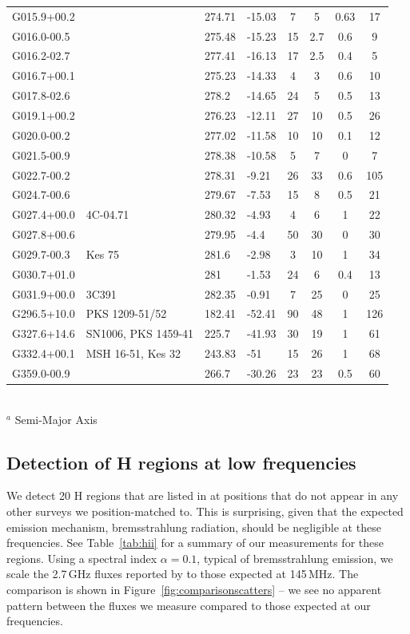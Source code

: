\documentclass[useAMS,usenatbib]{mn2e}
\begin{document}
\begin{table}
\begin{tabular}{llllcccc}
G015.9+00.2	&		&	274.71	&	-15.03	&	7	&	5	&	0.63	&	17	\\
G016.0-00.5	&		&	275.48	&	-15.23	&	15	&	2.7	&	0.6	&	9	\\
G016.2-02.7	&		&	277.41	&	-16.13	&	17	&	2.5	&	0.4	&	5	\\
G016.7+00.1	&		&	275.23	&	-14.33	&	4	&	3	&	0.6	&	10	\\
G017.8-02.6	&		&	278.2	&	-14.65	&	24	&	5	&	0.5	&	13	\\
G019.1+00.2	&		&	276.23	&	-12.11	&	27	&	10	&	0.5	&	26	\\
G020.0-00.2	&		&	277.02	&	-11.58	&	10	&	10	&	0.1	&	12	\\
G021.5-00.9	&		&	278.38	&	-10.58	&	5	&	7	&	0	&	7	\\
G022.7-00.2	&		&	278.31	&	-9.21	&	26	&	33	&	0.6	&	105	\\
G024.7-00.6	&		&	279.67	&	-7.53	&	15	&	8	&	0.5	&	21	\\
G027.4+00.0	&	4C-04.71	&	280.32	&	-4.93	&	4	&	6	&	1	&	22	\\
G027.8+00.6	&		&	279.95	&	-4.4	&	50	&	30	&	0	&	30	\\
G029.7-00.3	&	Kes 75	&	281.6	&	-2.98	&	3	&	10	&	1	&	34	\\
G030.7+01.0	&		&	281	&	-1.53	&	24	&	6	&	0.4	&	13	\\
G031.9+00.0	&	3C391	&	282.35	&	-0.91	&	7	&	25	&	0	&	25	\\
G296.5+10.0	&	PKS 1209-51/52	&	182.41	&	-52.41	&	90	&	48	&	1	&	126	\\
G327.6+14.6	&	SN1006, PKS 1459-41	&	225.7	&	-41.93	&	30	&	19	&	1	&	61	\\
G332.4+00.1	&	MSH 16-51, Kes 32	&	243.83	&	-51	&	15	&	26	&	1	&	68	\\
G359.0-00.9	&		&	266.7	&	-30.26	&	23	&	23	&	0.5	&	60	\\
\hline
\end{tabular}
\\
$^a$ Semi-Major Axis\\
\label{tab:IGNO}
\end{table}

\subsection{Detection of {H} regions at low frequencies}
\label{subsec:hii}
We detect 20 {H} regions that are listed in \cite{Paladini.03} at positions that do not appear in any other surveys we position-matched to. This is surprising, given that the expected emission mechanism, bremsstrahlung radiation, should be negligible at these frequencies. See Table~\ref{tab:hii} for a summary of our measurements for these regions. Using a spectral index $\alpha=0.1$, typical of bremsstrahlung emission, we scale the 2.7\,GHz fluxes reported by \cite{Paladini.03} to those expected at 145\,MHz. The comparison is shown in Figure~\ref{fig:comparisonscatters} -- we see no apparent pattern between the fluxes we measure compared to those expected at our frequencies. 
\end{document}
